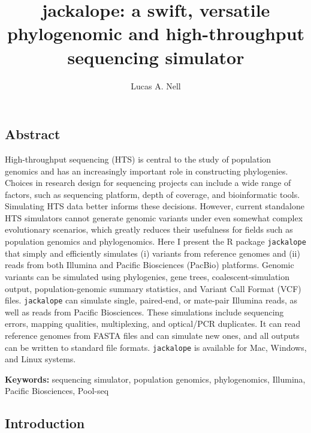 \documentclass[12pt,]{article}
\title{
    jackalope: a swift, versatile phylogenomic and high-throughput sequencing simulator
            }
\author[1]{Lucas A. Nell}
\affil[1]{Department of Integrative Biology, University of Wisconsin--Madison}
\date{}
\makeatletter
\def\maketitle{{%
  \renewenvironment{tabular}[2][]
    {\begin{flushleft}}
    {\end{flushleft}}
  \AB@maketitle}}
\makeatother
\begin{document}
            \maketitle
        



\raggedright

\hypertarget{abstract}{%
\subsection{Abstract}\label{abstract}}

High-throughput sequencing (HTS) is central to the study of population genomics
and has an increasingly important role in constructing phylogenies.
Choices in research design for sequencing projects can include
a wide range of factors, such as sequencing platform, depth of coverage, and
bioinformatic tools.
Simulating HTS data better informs these decisions.
However, current standalone HTS simulators cannot generate genomic variants under
even somewhat complex evolutionary scenarios, which greatly reduces their usefulness
for fields such as population genomics and phylogenomics.
Here I present the R package \texttt{jackalope} that simply and efficiently simulates
(i) variants from reference genomes and
(ii) reads from both Illumina and Pacific Biosciences (PacBio) platforms.
Genomic variants can be simulated using phylogenies, gene trees,
coalescent-simulation output, population-genomic summary statistics,
and Variant Call Format (VCF) files.
\texttt{jackalope} can simulate single, paired-end, or mate-pair Illumina reads,
as well as reads from Pacific Biosciences.
These simulations include sequencing errors, mapping qualities, multiplexing,
and optical/PCR duplicates.
It can read reference genomes from FASTA files and can simulate new ones,
and all outputs can be written to standard file formats.
\texttt{jackalope} is available for Mac, Windows, and Linux systems.

\textbf{Keywords:} sequencing simulator, population genomics, phylogenomics,
Illumina, Pacific Biosciences, Pool-seq

\hypertarget{introduction}{%
\subsection{Introduction}\label{introduction}}
\end{document}
